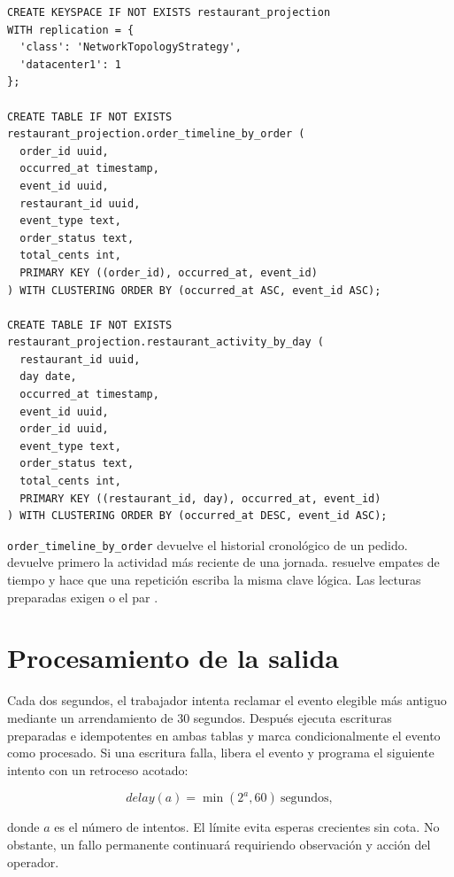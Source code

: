 \begin{lstlisting}[language=CQL,caption={Esquema de las dos proyecciones Cassandra},label={lst:cql}]
CREATE KEYSPACE IF NOT EXISTS restaurant_projection
WITH replication = {
  'class': 'NetworkTopologyStrategy',
  'datacenter1': 1
};

CREATE TABLE IF NOT EXISTS restaurant_projection.order_timeline_by_order (
  order_id uuid,
  occurred_at timestamp,
  event_id uuid,
  restaurant_id uuid,
  event_type text,
  order_status text,
  total_cents int,
  PRIMARY KEY ((order_id), occurred_at, event_id)
) WITH CLUSTERING ORDER BY (occurred_at ASC, event_id ASC);

CREATE TABLE IF NOT EXISTS restaurant_projection.restaurant_activity_by_day (
  restaurant_id uuid,
  day date,
  occurred_at timestamp,
  event_id uuid,
  order_id uuid,
  event_type text,
  order_status text,
  total_cents int,
  PRIMARY KEY ((restaurant_id, day), occurred_at, event_id)
) WITH CLUSTERING ORDER BY (occurred_at DESC, event_id ASC);
\end{lstlisting}

\nolinkurl{order_timeline_by_order} devuelve el historial cronológico de un pedido. \allowbreak{} devuelve primero la actividad más reciente de una jornada.  resuelve empates de tiempo y hace que una repetición escriba la misma clave lógica. Las lecturas preparadas exigen  o el par .

\section{Procesamiento de la salida}

Cada dos segundos, el trabajador intenta reclamar el evento elegible más antiguo mediante un arrendamiento de 30 segundos. Después ejecuta escrituras preparadas e idempotentes en ambas tablas y marca condicionalmente el evento como procesado. Si una escritura falla, libera el evento y programa el siguiente intento con un retroceso acotado:

\begin{equation}
  \textit{delay}(a) = \min\left(2^{a}, 60\right)\ \text{segundos},
  \label{eq:backoff}
\end{equation}

donde \(a\) es el número de intentos. El límite evita esperas crecientes sin cota. No obstante, un fallo permanente continuará requiriendo observación y acción del operador.

